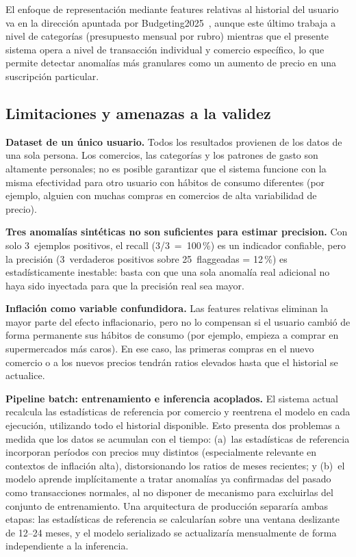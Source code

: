 \documentclass[conference]{IEEEtran}
\begin{document}
El enfoque de representaci\'on mediante features relativas al historial del usuario
va en la direcci\'on apuntada por Budgeting2025~\cite{budgeting2025ml}, aunque
este \'ultimo trabaja a nivel de categor\'ias (presupuesto mensual por rubro) mientras
que el presente sistema opera a nivel de transacci\'on individual y comercio espec\'ifico,
lo que permite detectar anomal\'ias m\'as granulares como un aumento de precio en una
suscripci\'on particular.

\subsection{Limitaciones y amenazas a la validez}

\textbf{Dataset de un \'unico usuario.}  Todos los resultados provienen de los datos
de una sola persona. Los comercios, las categor\'ias y los patrones de gasto son
altamente personales; no es posible garantizar que el sistema funcione con la misma
efectividad para otro usuario con h\'abitos de consumo diferentes (por ejemplo, alguien
con muchas compras en comercios de alta variabilidad de precio).

\textbf{Tres anomal\'ias sint\'eticas no son suficientes para estimar precision.}
Con solo 3~ejemplos positivos, el recall (3/3~=~100\,\%) es un indicador confiable,
pero la precisi\'on (3~verdaderos positivos sobre 25~flaggeadas = 12\,\%) es
estad\'isticamente inestable: basta con que una sola anomal\'ia real adicional
no haya sido inyectada para que la precisi\'on real sea mayor.

\textbf{Inflaci\'on como variable confundidora.}  Las features relativas eliminan
la mayor parte del efecto inflacionario, pero no lo compensan si el usuario
cambi\'o de forma permanente sus h\'abitos de consumo (por ejemplo, empieza a comprar
en supermercados m\'as caros). En ese caso, las primeras compras en el nuevo comercio
o a los nuevos precios tendr\'an ratios elevados hasta que el historial se actualice.

\textbf{Pipeline batch: entrenamiento e inferencia acoplados.}  El sistema actual
recalcula las estad\'isticas de referencia por comercio y reentrena el modelo en
cada ejecuci\'on, utilizando todo el historial disponible. Esto presenta dos
problemas a medida que los datos se acumulan con el tiempo: (a)~las estad\'isticas
de referencia incorporan per\'iodos con precios muy distintos (especialmente
relevante en contextos de inflaci\'on alta), distorsionando los ratios de meses
recientes; y (b)~el modelo aprende impl\'icitamente a tratar anomal\'ias ya
confirmadas del pasado como transacciones normales, al no disponer de mecanismo
para excluirlas del conjunto de entrenamiento. Una arquitectura de producci\'on
separar\'ia ambas etapas: las estad\'isticas de referencia se calcular\'ian sobre
una ventana deslizante de 12--24 meses, y el modelo serializado se actualizar\'ia
mensualmente de forma independiente a la inferencia.
\end{document}
